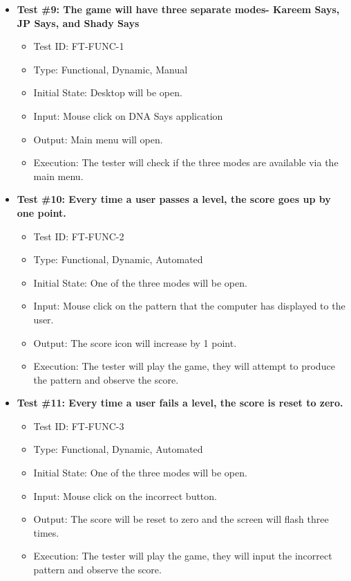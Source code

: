 \documentclass[12pt, titlepage]{article}
\begin{document}
\begin{itemize}

\item \textbf{Test \#9: The game will have three separate modes- Kareem Says, JP Says, and Shady Says }
\begin{itemize}
\item Test ID: FT-FUNC-1
\item Type: Functional, Dynamic, Manual 		
\item Initial State: Desktop will be open.					
\item Input: Mouse click on DNA Says application	
\item Output: Main menu will open.					
\item Execution: The tester will check if the three modes are available via the main menu.
\end{itemize}

\item \textbf{Test \#10: Every time a user passes a level, the score goes up by one point.}
\begin{itemize}
\item Test ID: FT-FUNC-2
\item Type: Functional, Dynamic, Automated		
\item Initial State: One of the three modes will be open.					
\item Input: Mouse click on the pattern that the computer has displayed to the user.					
\item Output: The score icon will increase by 1 point. 					
\item Execution: The tester will play the game, they will attempt to produce the pattern and observe the score.
\end{itemize}

\item \textbf{Test \#11: Every time a user fails a level, the score is reset to zero.}
\begin{itemize}
\item Test ID: FT-FUNC-3
\item Type: Functional, Dynamic, Automated	
\item Initial State: One of the three modes will be open.					
\item Input: Mouse click on the incorrect button.					
\item Output: The score will be reset to zero and the screen will flash three times. 					
\item Execution: The tester will play the game, they will input the incorrect pattern and observe the score.
\end{itemize}


\end{itemize}
\end{document}
